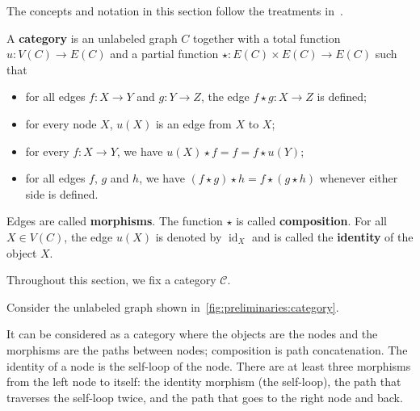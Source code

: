  The concepts and notation in this section follow the treatments in~\cite{pierce1991basic,barr1990category}.

\begin{definition}
    \label{def:cat}
    A \textbf{category} is an unlabeled graph \( C \) together with a total function \( u : V(C) \to E(C) \) and a partial function \( \star: E(C) \times E(C) \to E(C) \) such that 
        \begin{itemize}
            \item for all edges \( f:X \to Y \) and \( g:Y \to Z \), the edge \( f \star g :X \to Z \) is defined; 
            \item  for every node \( X \), \( u(X) \) is an edge from \( X \) to \( X \);
            \item for every \( f:X \to Y \), we have \(u(X) \star f = f = f \star u(Y)\);
            \item for all edges \( f \), \( g \) and \(h\), we have \( (f \star g) \star h = f \star (g \star h) \) whenever either side is defined.
        \end{itemize}
    Edges are called \textbf{morphisms}. The function $\star$ is called \textbf{composition}. For all \( X \in V(C) \), the edge \( u(X) \) is denoted by \( \operatorname{id}_X \) and is called the \textbf{identity} of the object \( X \).
\end{definition} 
 Throughout this section, we fix a category \( \mathcal{C} \).
\begin{example}
    Consider the unlabeled graph shown in~\autoref{fig:preliminaries:category}. 
        \begin{figure}[H]
        \centering
        \caption{}
        \label{fig:preliminaries:category}
    \end{figure}
    It can be considered as a category where the objects are the nodes and the morphisms are the paths between nodes; composition is path concatenation. The identity of a node is the self-loop of the node. There are at least three morphisms from the left node to itself: the identity morphism (the self-loop), the path that traverses the self-loop twice, and the path that goes to the right node and back.
\end{example}

